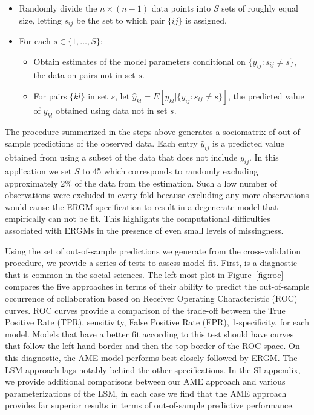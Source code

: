 \documentclass[9pt,twocolumn,twoside,lineno]{pnas-new}
\begin{document}
\begin{itemize}
	\item Randomly divide the $n \times (n-1)$ data points into $S$ sets of roughly equal size, letting $s_{ij}$ be the set to which pair $\{ij\}$ is assigned.
	\item For each $s \in \{1, \ldots, S\}$:
	\begin{itemize}
		\item Obtain estimates of the model parameters conditional on $\{y_{ij} : s_{ij} \neq s\}$, the data on pairs not in set $s$.
		\item For pairs $\{kl\}$ in set $s$, let $\hat y_{kl} = E[y_{kl} | \{y_{ij} : s_{ij} \neq s\}]$, the predicted value of $y_{kl}$ obtained using data not in set $s$.
	\end{itemize}
\end{itemize}

The procedure summarized in the steps above generates a sociomatrix of out-of-sample predictions of the observed data. Each entry $\hat y_{ij}$ is a predicted value obtained from using a subset of the data that does not include $y_{ij}$. In this application we set $S$ to 45 which corresponds to randomly excluding approximately 2\% of the data from the estimation. Such a low number of observations were excluded in every fold because excluding any more observations would cause the ERGM specification to result in a degenerate model that empirically can not be fit. This highlights the computational difficulties associated with ERGMs in the presence of even small levels of missingness.

Using the set of out-of-sample predictions we generate from the cross-validation procedure, we provide a series of tests to assess model fit. First, is a diagnostic that is common in the social sciences. The left-most plot in Figure~\ref{fig:roc} compares the five approaches in terms of their ability to predict the out-of-sample occurrence of collaboration based on Receiver Operating Characteristic (ROC) curves. ROC curves provide a comparison of the trade-off between the True Positive Rate (TPR), sensitivity, False Positive Rate (FPR), 1-specificity, for each model. Models that have a better fit according to this test should have curves that follow the left-hand border and then the top border of the ROC space. On this diagnostic, the AME model performs best closely followed by ERGM. The LSM approach lags notably behind the other specifications. In the SI appendix, we provide additional comparisons between our AME approach and various parameterizations of the LSM, in each case we find that the AME approach provides far superior results in terms of out-of-sample predictive performance.
\end{document}
